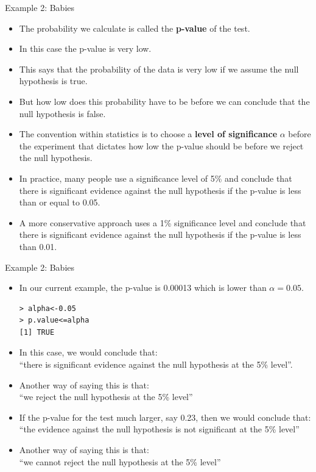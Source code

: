 \documentclass[handout]{beamer}
\begin{document}
\begin{frame}{Example 2: Babies}
\scriptsize{

\begin{itemize}
 \item The probability we calculate is called the \textbf{p-value} of the test. 
 \item In this case the p-value is very low.
 \item This says that the probability of the data is very low if we assume the null hypothesis is true.
 \item But how low does this probability have to be before we can conclude that the null hypothesis is false.
 \item The convention within statistics is to choose a \textbf{level of significance} $\alpha$ before the experiment that dictates how low the p-value should be before we reject the null hypothesis. 
 \item In practice, many people use a significance level of 5\% and conclude that there is significant evidence against the null hypothesis if the p-value is less than or equal to 0.05.
 \item A more conservative approach uses a 1\% significance level and conclude that there is significant evidence against the null hypothesis if the p-value is less than 0.01.
 
\end{itemize}


} 
\end{frame}




\begin{frame}[fragile]{Example 2: Babies}
\scriptsize{

\begin{itemize}
 \item In our current example, the p-value is 0.00013 which is lower than $\alpha=0.05$. 
 \begin{verbatim}
> alpha<-0.05
> p.value<=alpha
[1] TRUE
 \end{verbatim}

 
 \item In this case, we would conclude that: \\ 
 ``there is significant evidence against the null hypothesis at the 5\% level''.
 \item Another way of saying this is that: \\
``we reject the null hypothesis at the 5\% level''
\item If the p-value for the test much larger, say 0.23, then we would conclude that: \\
``the evidence against the null hypothesis is not significant at the 5\% level''
\item Another way of saying this is that: \\
``we cannot reject the null hypothesis at the 5\% level''
  
\end{itemize}

} 
\end{frame}
\end{document}
